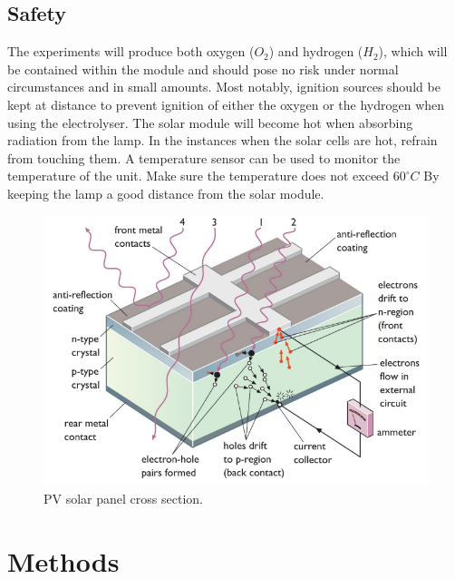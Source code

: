 \documentclass{article}
\begin{document}
    \subsection{Safety}
    The experiments will produce both oxygen (\(O_2\)) and hydrogen (\(H_2\)), which will be contained within the module 
    and should pose no risk under normal circumstances and in small amounts. Most notably, ignition sources should be 
    kept at distance to prevent ignition of either the oxygen or the hydrogen when using the electrolyser.
    \newline The solar module will become hot when absorbing radiation from the lamp. In the instances when the solar cells 
    are hot, refrain from touching them. A temperature sensor can be used to monitor the temperature of the unit. 
    Make sure the temperature does not exceed \(60^{\circ}C\) By keeping the lamp a good distance from the solar module.
    \begin{figure}
        \centering
        \includegraphics[scale=0.4]{./cell.png}
        \caption{PV solar panel cross section. \cite{P:SE}}
    \end{figure}
    \section{Methods}
\end{document}
